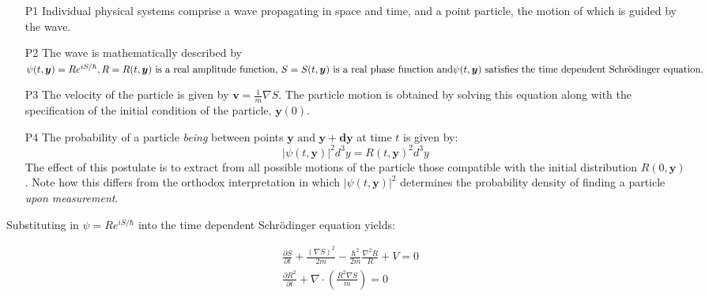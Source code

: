\documentclass{article}
\begin{document}
\begin{itemize}
\item [P1] Individual physical systems comprise a wave propagating in space and time, and a point particle, the motion of which is guided by the wave.
\item [P2] The wave is mathematically described by $\psi(t,\boldsymbol{y}) = Re^{iS/\hbar}, R=R(t,\boldsymbol{y}) \text{ is a real amplitude function, } \\S=S(t,\boldsymbol{y}) \text{ is a real phase function and} \psi(t,\boldsymbol{y}) \text{ satisfies the time dependent Schr{\"o}dinger equation.}$
\item [P3] The velocity of the particle is given by $\boldsymbol{v} = \frac{1}{m}\nabla{S}$. The particle motion is obtained by solving this equation along with the specification of the initial condition of the particle, $\boldsymbol{y}(0)$.
\item [P4] The probability of a particle \textit{being} between points $\boldsymbol{y} \text{ and } \boldsymbol{y + dy}$ at time $t$ is given by:
\begin{equation}
	|\psi(t,\boldsymbol{y})|^2d^3y = R(t,\boldsymbol{y})^2d^3y
\end{equation}
The effect of this postulate is to extract from all possible motions of the particle those compatible with the initial distribution $R(0,\boldsymbol{y})$. Note how this differs from the orthodox interpretation in which $|\psi(t,\boldsymbol{y})|^2$ determines the probability density of finding a particle \textit{upon measurement}.
\end{itemize}

\noindent Substituting in $\psi = Re^{iS/\hbar}$ into the time dependent Schr{\"o}dinger equation yields:

\begin{subequations}
\begin{align}
	&\frac{\partial S}{\partial t}+\frac{(\nabla S)^2}{2m}-\frac{\hbar^2}{2m}\frac{\nabla^2 R}{R}+V=0 \label{dBBHJ} \\
	&\frac{\partial R^2}{\partial t}+\nabla\cdot\left(\frac{R^2\nabla S}{m}\right)=0 \label{dBBcontinuity}
\end{align}
\end{subequations}
\end{document}
